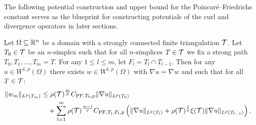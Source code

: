 \documentclass[10pt,letterpaper]{article}
\begin{document}
The following potential construction and upper bound for the Poincar\'e--Friedrichs constant 
serves as the blueprint for constructing potentials of the curl and divergence operators in later sections. 

\begin{theorem}\label{theorem:poincarefriedrichsestimate:gradzwei}
    Let $\Omega \subseteq {\mathbb R}^{n}$ be a domain with a strongly connected finite triangulation ${\mathcal T}$.
    Let $T_0 \in {\mathcal T}$ be an $n$-simplex such that for all $n$-simplices $T \in {\mathcal T}$ 
    we fix a strong path $T_0, T_1, \dots, T_m = T$.
    For any $1 \leq l \leq m$, let $F_{l} = T_{l} \cap T_{l-1}$.
    Then for any $u \in W^{1,p}(\Omega)$ 
    there exists $w \in W^{1,p}(\Omega)$ with $\nabla u = \nabla w$ 
    and such that for all $T \in {\mathcal T}$:
    \begin{align*}
        \| w_{m} \|_{L^{p}(T_m)}
        &\leq 
        \rho({\mathcal T})^{\frac m p}
        C_{{\rm PF},T_{0},p} 
        \| \nabla u \|_{L^{p}( T_{0} )}
        \\&\quad 
        +
        \sum_{l=1}^{m} 
        \rho({\mathcal T})^{\frac {m-l} p}
        C_{{\rm PF},T_{l},F_{l},p} 
        \left( 
            \| \nabla u \|_{L^{p}(T_{l})} 
            +
            \rho({\mathcal T})^{\frac {1} p}
            \xi({\mathcal T})
            \| \nabla u \|_{L^{p}(T_{l-1})} 
        \right)
        .
    \end{align*}
\end{theorem}
\end{document}
